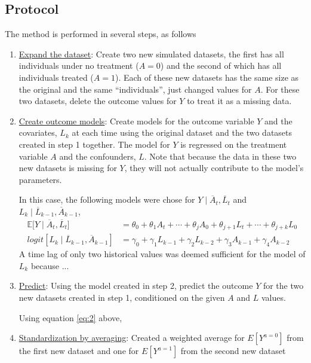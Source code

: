 \subsection{Protocol} 
The method is performed in several steps, as follows 
\begin{enumerate}
\item \underline{Expand the dataset}: Create two new simulated datasets, the first has all individuals under no treatment ($A=0$) and the second of which has all individuals treated ($A=1$).  Each of these new datasets has the same size as the original and the same ``individuals'', just changed values for $A$.  For these two datasets, delete the outcome values for $Y$ to treat it as a missing data.  

\item \underline{Create outcome models}: Create models for the outcome variable $Y$ and the covariates, $L_k$ at each time using the original dataset and the two datasets created in step 1 together.  The model for $Y$ is regressed on the treatment variable $A$ and the confounders, $L$.  Note that because the data in these two new datasets is missing for $Y$, they will not actually contribute to the model's parameters.  

In this case, the following models were chose for $Y \mid  \overline{A}_t, \overline{L}_t$ and $L_k \mid \overline{L}_{k-1}, \overline{A}_{k-1}$, 
\begin{align} 
\mathbb{E} \big[Y \mid \overline{A}_t, \overline{L}_t \big] &= \theta_{0} + \theta_1 A_{t} + \cdots + \theta_j A_0 + \theta_{j+1} L_t + \cdots + \theta_{j+k} L_0 \label{eq:2} \\ 
logit[L_k \mid \overline{L}_{k-1}, \overline{A}_{k-1}] &= \gamma_0 + \gamma_1 L_{k-1} + \gamma_2 L_{k-2} + \gamma_3 A_{k-1} + \gamma_4 A_{k-2} 
\end{align} 
A time lag of only two historical values was deemed sufficient for the model of $L_k$ because ... 


\item \underline{Predict}: Using the model created in step 2, predict the outcome $Y$ for the two new datasets created in step 1, conditioned on the given $A$ and $L$ values.  

Using equation \ref{eq:2} above, 

\item \underline{Standardization by averaging}:  Created a weighted average for $E[Y^{a=0}]$ from the first new dataset and one for $E[Y^{a=1}]$ from the second new dataset
\end{enumerate} 


